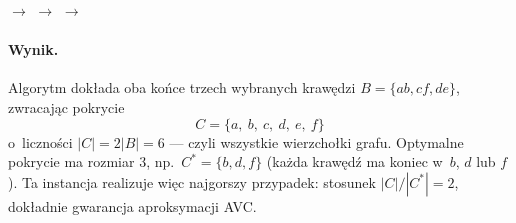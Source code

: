 \begin{azfigure}
	\centering
	\;$\rightarrow$\;%
	\;$\rightarrow$\;%
	\;$\rightarrow$\;%
\end{azfigure}

\paragraph{Wynik.}
Algorytm dokłada oba końce trzech wybranych krawędzi $B = \{ab, cf, de\}$,
zwracając pokrycie
\[
	\boxed{C = \{a,\ b,\ c,\ d,\ e,\ f\}}
\]
o~liczności $|C| = 2|B| = 6$ --- czyli wszystkie wierzchołki grafu. Optymalne
pokrycie ma rozmiar $3$, np.\ $C^* = \{b, d, f\}$ (każda krawędź ma koniec
w~$b$, $d$ lub $f$). Ta instancja realizuje więc najgorszy przypadek: stosunek
$|C| / |C^*| = 2$, dokładnie gwarancja aproksymacji \textsc{AVC}.
